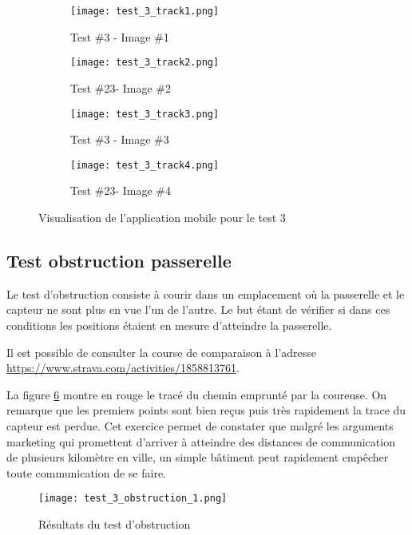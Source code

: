 \begin{figure}[tb]
\centering
\begin{subfigure}{0.7\textwidth}
  \centering
  \texttt{[image: test\_3\_track1.png]}
  \caption{Test \#3 - Image \#1}
  \label{fig:test_3_track1}
\end{subfigure}%

\begin{subfigure}{0.7\textwidth}
  \centering
  \texttt{[image: test\_3\_track2.png]}
  \caption{Test \#23- Image \#2}
  \label{fig:test_3_track2}
\end{subfigure}

\begin{subfigure}{0.7\textwidth}
  \centering
  \texttt{[image: test\_3\_track3.png]}
  \caption{Test \#3 - Image \#3}
  \label{fig:test_3_track3}
\end{subfigure}%

\begin{subfigure}{0.7\textwidth}
  \centering
  \texttt{[image: test\_3\_track4.png]}
  \caption{Test \#23- Image \#4}
  \label{fig:test_3_track4}
\end{subfigure}
\caption{Visualisation de l'application mobile pour le test 3}
\label{fig:test_3}
\end{figure}

\subsection{Test obstruction passerelle}

Le test d'obstruction consiste à courir dans un emplacement où la passerelle et le capteur ne sont plus en vue l'un de l'autre. Le but étant de vérifier si dans ces conditions les positions étaient en mesure d'atteindre la passerelle.

Il est possible de consulter la course de comparaison à l'adresse \url{https://www.strava.com/activities/1858813761}.

La figure \ref{fig:test_3_obstru} montre en rouge le tracé du chemin emprunté par la coureuse. On remarque que les premiers points sont bien reçus puis très rapidement la trace du capteur est perdue. Cet exercice permet de constater que malgré les arguments marketing qui promettent d'arriver à atteindre des distances de communication de plusieurs kilomètre en ville, un simple bâtiment peut rapidement empêcher toute communication de se faire.

\begin{figure}[htb]
\centering 
\texttt{[image: test\_3\_obstruction\_1.png]} 
\caption{Résultats du test d'obstruction}
\label{fig:test_3_obstru}
\end{figure}

